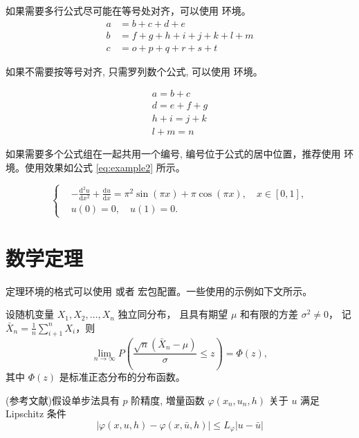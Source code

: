 \documentclass[report,oneside,UTF8,zihao=-4]{config}
\begin{document}
如果需要多行公式尽可能在等号处对齐，可以使用  环境。
\begin{align}
    a & = b + c + d + e \\
    b & = f + g + h + i + j + k + l + m \\
    c & = o + p + q + r + s + t
\end{align}

如果不需要按等号对齐, 只需罗列数个公式, 可以使用  环境。

\begin{gather}
    a = b + c \\
    d = e + f + g \\
    h + i = j + k \\
    l + m = n
\end{gather}

如果需要多个公式组在一起共用一个编号, 编号位于公式的居中位置，推荐使用  环境。使用效果如公式 \eqref{eq:example2} 所示。

\begin{equation}
    \label{eq:example2}
    \left\{
        \begin{aligned}
          &-\frac{\mathrm{d}^{2} u}{\mathrm{d} x^{2}}+\frac{\mathrm{d} u}{\mathrm{d} x}=\pi^{2} \sin (\pi x)+\pi \cos (\pi x),\quad x \in [0,1], \\
          &u(0)=0,\quad u(1)=0.
        \end{aligned} 
    \right.
\end{equation}

\section{数学定理}

定理环境的格式可以使用  或者  宏包配置。一些使用的示例如下文所示。

\begin{theorem}
    设随机变量 $X_1, X_2, \dots, X_n$ 独立同分布， 且具有期望 $\mu$ 和有限的方差 $\sigma^2 \ne 0$，
    记 $\bar{X}_n = \frac{1}{n} \sum_{i+1}^n X_i$，则
    \begin{equation}
        \lim_{n \to \infty} P \left(\frac{\sqrt{n} \left( \bar{X}_n - \mu \right)}{\sigma} \le z \right) = \Phi(z),
    \end{equation}
    其中 $\Phi(z)$ 是标准正态分布的分布函数。
\end{theorem}

\begin{lemma}\label{lemma-convergence} 
    (参考文献\cite{aaas1883science})假设单步法具有 $p$ 阶精度, 増量函数 $\varphi(x_{n}, u_{n}, h)$ 关于 $u$ 满足 {\rm Lipschitz} 条件
    \begin{equation}\label{eqn:3}
        |\varphi(x, u, h)-\varphi(x, \bar{u}, h)| \leqslant L_{\varphi}|u-\bar{u}|
    \end{equation}
\end{lemma}
\end{document}
